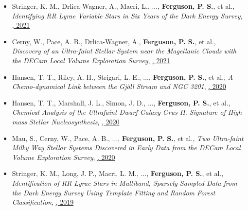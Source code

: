 \begin{itemize}[itemsep=1pt]
    \item {Stringer}, K. M., {Drlica-Wagner}, A., {Macri}, L., ..., \textbf{Ferguson, P. S.}, et al., \textit{{Identifying RR Lyrae Variable Stars in Six Years of the Dark Energy Survey}}, \href{https://ui.adsabs.harvard.edu/abs/2021ApJ...911..109S}{\textbf{\apj}, 2021}
    \item {Cerny}, W., {Pace}, A. B., {Drlica-Wagner}, A., \textbf{Ferguson, P. S.}, et al., \textit{{Discovery of an Ultra-faint Stellar System near the Magellanic Clouds with the DECam Local Volume Exploration Survey}}, \href{https://ui.adsabs.harvard.edu/abs/2021ApJ...910...18C}{\textbf{\apj}, 2021}
    \item {Hansen}, T. T., {Riley}, A. H., {Strigari}, L. E., ..., \textbf{Ferguson, P. S.}, et al., \textit{{A Chemo-dynamical Link between the Gj{\"o}ll Stream and NGC 3201}}, \href{https://ui.adsabs.harvard.edu/abs/2020ApJ...901...23H}{\textbf{\apj}, 2020}
    \item {Hansen}, T. T., {Marshall}, J. L., {Simon}, J. D., ..., \textbf{Ferguson, P. S.}, et al., \textit{{Chemical Analysis of the Ultrafaint Dwarf Galaxy Grus II. Signature of High-mass Stellar Nucleosynthesis}}, \href{https://ui.adsabs.harvard.edu/abs/2020ApJ...897..183H}{\textbf{\apj}, 2020}
    \item {Mau}, S., {Cerny}, W., {Pace}, A. B., ..., \textbf{Ferguson, P. S.}, et al., \textit{{Two Ultra-faint Milky Way Stellar Systems Discovered in Early Data from the DECam Local Volume Exploration Survey}}, \href{https://ui.adsabs.harvard.edu/abs/2020ApJ...890..136M}{\textbf{\apj}, 2020}
    \item {Stringer}, K. M., {Long}, J. P., {Macri}, L. M., ..., \textbf{Ferguson, P. S.}, et al., \textit{{Identification of RR Lyrae Stars in Multiband, Sparsely Sampled Data from the Dark Energy Survey Using Template Fitting and Random Forest Classification}}, \href{https://ui.adsabs.harvard.edu/abs/2019AJ....158...16S}{\textbf{\aj}, 2019}
\end{itemize}

